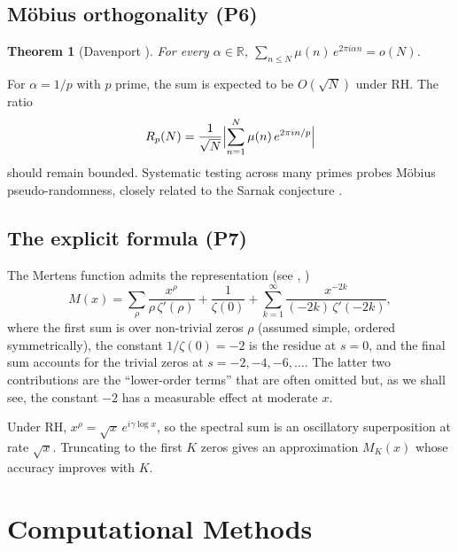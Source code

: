 \documentclass[11pt,a4paper]{article}
\newtheorem{theorem}{Theorem}[section]
\theoremstyle{definition}
\newcommand{\RR}{\mathbb{R}}
\begin{document}
\subsection{M\"obius orthogonality (P6)}

\begin{theorem}[Davenport \cite{Davenport1937}]\label{thm:davenport}
For every $\alpha \in \RR$,
$\sum_{n \leq N} \mu(n)\, e^{2\pi i \alpha n} = o(N)$.
\end{theorem}

For $\alpha = 1/p$ with $p$ prime, the sum is expected to be $O(\sqrt{N})$ under RH. The ratio
\begin{equation}\label{eq:ortho-ratio}
  R_p(N) = \frac{1}{\sqrt{N}} \Bigl|\sum_{n=1}^{N} \mu(n)\, e^{2\pi i n/p}\Bigr|
\end{equation}
should remain bounded. Systematic testing across many primes probes M\"obius pseudo-randomness, closely related to the Sarnak conjecture \cite{Sarnak2011}.

\subsection{The explicit formula (P7)}
\label{sec:explicit-theory}

The Mertens function admits the representation (see \cite[Ch.~12]{Edwards1974}, \cite[Ch.~14]{Titchmarsh1986})
\begin{equation}\label{eq:explicit}
  M(x) = \sum_\rho \frac{x^\rho}{\rho\,\zeta'(\rho)} + \frac{1}{\zeta(0)} + \sum_{k=1}^{\infty} \frac{x^{-2k}}{(-2k)\,\zeta'(-2k)},
\end{equation}
where the first sum is over non-trivial zeros $\rho$ (assumed simple, ordered symmetrically), the constant $1/\zeta(0) = -2$ is the residue at $s = 0$, and the final sum accounts for the trivial zeros at $s = -2, -4, -6, \ldots$. The latter two contributions are the ``lower-order terms'' that are often omitted but, as we shall see, the constant $-2$ has a measurable effect at moderate $x$.

Under RH, $x^\rho = \sqrt{x}\,e^{i\gamma\log x}$, so the spectral sum is an oscillatory superposition at rate $\sqrt{x}$. Truncating to the first $K$ zeros gives an approximation $M_K(x)$ whose accuracy improves with $K$.

\section{Computational Methods}
\label{sec:methods}
\end{document}
